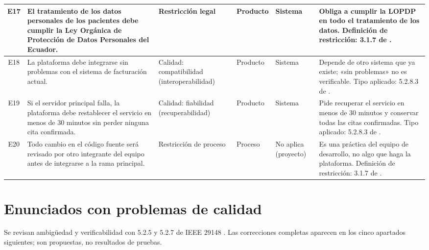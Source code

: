 \documentclass[11pt,a4paper]{article}
\begin{document}
\begin{longtable}{|c|L{4.0cm}|L{2.3cm}|L{1.7cm}|L{1.7cm}|L{3.4cm}|}
E17 & El tratamiento de los datos personales de los pacientes debe cumplir la Ley Orgánica de Protección de Datos Personales del Ecuador. & Restricción legal & Producto & Sistema & Obliga a cumplir la LOPDP en todo el tratamiento de los datos. Definición de restricción: 3.1.7 de \cite{iso29148}. \\ \hline
E18 & La plataforma debe integrarse sin problemas con el sistema de facturación actual. & Calidad: compatibilidad (interoperabilidad) & Producto & Sistema & Depende de otro sistema que ya existe; «sin problemas» no es verificable. Tipo aplicado: 5.2.8.3 de \cite{iso29148}. \\ \hline
E19 & Si el servidor principal falla, la plataforma debe restablecer el servicio en menos de 30 minutos sin perder ninguna cita confirmada. & Calidad: fiabilidad (recuperabilidad) & Producto & Sistema & Pide recuperar el servicio en menos de 30 minutos y conservar todas las citas confirmadas. Tipo aplicado: 5.2.8.3 de \cite{iso29148}. \\ \hline
E20 & Todo cambio en el código fuente será revisado por otro integrante del equipo antes de integrarse a la rama principal. & Restricción de proceso & Proceso & No aplica (proyecto) & Es una práctica del equipo de desarrollo, no algo que haga la plataforma. Definición de restricción: 3.1.7 de \cite{iso29148}. \\ \hline
\end{longtable}
\endgroup

\section{Enunciados con problemas de calidad}

Se revisan ambigüedad y verificabilidad con 5.2.5 y 5.2.7 de IEEE 29148 \cite{iso29148}. Las correcciones completas aparecen en los cinco apartados siguientes; son propuestas, no resultados de pruebas.
\end{document}
